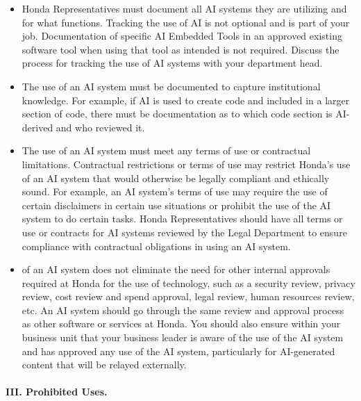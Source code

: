 \documentclass[12pt, arial]{article}
\begin{document}
\begin {itemize}
\item Honda Representatives must document all AI systems they are utilizing and for what functions. Tracking the use of AI is not optional and is part of your job. Documentation of specific AI Embedded Tools in an approved existing software tool when using that tool as intended is not required. Discuss the process for tracking the use of AI systems with your department head.
\item The use of an AI system must be documented to capture institutional knowledge. For example, if AI is used to create code and included in a larger section of code, there must be documentation as to which code section is AI-derived and who reviewed it.
\item The use of an AI system must meet any terms of use or contractual limitations. Contractual restrictions or terms of use may restrict Honda’s use of an AI system that would otherwise be legally compliant and ethically sound. For example, an AI system’s terms of use may require the use of certain disclaimers in certain use situations or prohibit the use of the AI system to do certain tasks. Honda Representatives should have all terms or use or contracts for AI systems reviewed by the Legal Department to ensure compliance with contractual obligations in using an AI system.
\item of an AI system does not eliminate the need for other internal approvals required at Honda for the use of technology, such as a security review, privacy review, cost review and spend approval, legal review, human resources review, etc. An AI system should go through the same review and approval process as other software or services at Honda. You should also ensure within your business unit that your business leader is aware of the use of the AI system and has approved any use of the AI system, particularly for AI-generated content that will be relayed externally.
\end {itemize}
\paragraph{\textbf III. Prohibited Uses.}
\end{document}
